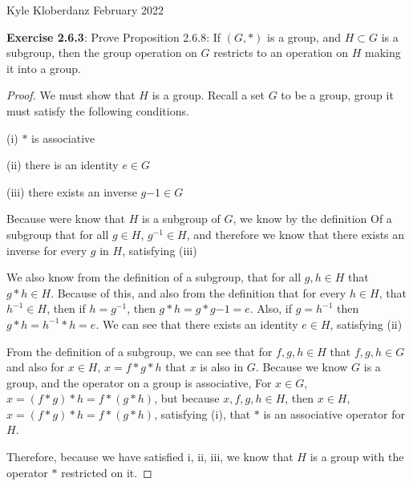 \documentclass[a4paper]{article}
\begin{document}
\begin{myparindent}{0pt}

Kyle Kloberdanz  February 2022 \newline

\textbf{Exercise 2.6.3}:
Prove Proposition 2.6.8: If $(G, *)$ is a group, and $H \subset G$ is a
subgroup, then the group operation on $G$ restricts to an operation on $H$
making it into a group. \newline

\begin{proof}
  We must show that $H$ is a group. Recall a set $G$ to be a group, group it
  must satisfy the following conditions.

  (i) $*$ is associative

  (ii) there is an identity $e \in G$

  (iii) there exists an inverse $g{-1} \in G$
  \newline

  Because were know that $H$ is a subgroup of $G$, we know by the definition Of
  a subgroup that for all $g \in H$, $g^{-1} \in H$, and therefore we know that
  there exists an inverse for every $g$ in $H$, satisfying (iii) \newline

  We also know from the definition of a subgroup, that for all $g, h \in H$ that
  $g * h \in H$. Because of this, and also from the definition that for every
  $h \in H$, that $h^{-1} \in H$, then if $h = g^{-1}$, then
  $g * h = g * g{-1} = e$. Also, if $g = h^{-1}$ then $g * h = h^{-1} * h = e$.
  We can see that there exists an identity $e \in H$, satisfying (ii) \newline

  From the definition of a subgroup, we can see that for $f, g, h \in H$ that
  $f, g, h \in G$ and also for $x \in H$, $x = f * g * h$ that $x$ is also in
  $G$. Because we know $G$ is a group, and the operator on a group is
  associative, For $x \in G$, $x = (f * g) * h = f * (g * h)$, but because
  $x, f, g, h \in H$, then $x \in H$, $x = (f * g) * h = f * (g * h)$,
  satisfying (i), that $*$ is an associative operator for $H$. \newline

  Therefore, because we have satisfied i, ii, iii, we know that $H$ is a group
  with the operator $*$ restricted on it.
  \newline
\end{proof}


\end{myparindent}
\end{document}
